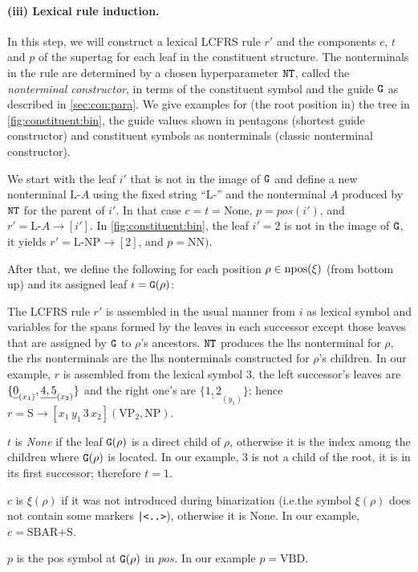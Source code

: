 \documentclass[../document.tex]{subfiles}
\begin{document}
    \paragraph{(iii) Lexical rule induction.}
    In this step, we will construct a lexical LCFRS rule \(r'\) and the components \(c\), \(t\) and \(p\) of the supertag for each leaf in the constituent structure.
    The nonterminals in the rule are determined by a chosen hyperparameter \(\texttt{NT}\), called the \emph{nonterminal constructor}, in terms of the constituent symbol and the guide \(\texttt{G}\) as described in \cref{sec:con:para}.
    We give examples for (the root position in) the tree in \cref{fig:constituent:bin}, the guide values shown in pentagons (shortest guide constructor) and constituent symbols as nonterminals (classic nonterminal constructor).

    We start with the leaf \(i'\) that is not in the image of \(\texttt{G}\) and define a new nonterminal \(\text{L-}A\) using the fixed string ``L-'' and the nonterminal \(A\) produced by \(\texttt{NT}\) for the parent of \(i'\).
    In that case \(c = t = \text{None}\), \(p = \mathit{pos}(i')\), and \(r' = \text{L-}A \to [i']\).
    In \cref{fig:constituent:bin}, the leaf \(i'=2\) is not in the image of \(\texttt{G}\), it yields \(r' = \text{L-NP} \to [2]\), and \(p = \text{NN})\).

    After that, we define the following for each position \(\rho \in \operatorname{npos}(\xi)\) (from bottom up) and its assigned leaf \(i = \texttt{G}(\rho)\):
    \begin{asparaitem}
        \item
        The LCFRS rule \(r'\) is assembled in the usual manner from \(i\) as lexical symbol and variables for the spans formed by the leaves in each successor except those leaves that are assigned by \(\texttt{G}\) to \(\rho\)'s ancestors.
        \(\texttt{NT}\) produces the lhs nonterminal for \(\rho\), the rhs nonterminals are the lhs nonterminals constructed for \(\rho\)'s children.
        In our example, \(r\) is assembled from the lexical symbol \(3\), the left successor's leaves are \(\{\underline{0\vphantom{,}}_{(x_1)}, \underline{4,5} _{(x_2)}\}\) and the right one's are \(\{\underline{1,2} _{(y_1)}\}\);
        hence \(r = \text{S} \to [x_1 \, y_1 \, 3 \, x_2] (\text{VP}_2, \text{NP})\).

        \item
        \(t\) is \emph{None} if the leaf \(\texttt{G}(\rho)\) is a direct child of \(\rho\), otherwise it is the index among the children where \(\texttt{G}(\rho)\) is located.
        In our example, 3 is not a child of the root, it is in its first successor; therefore \(t=1\).

        \item
        \(c\) is \(\xi(\rho)\) if it was not introduced during binarization (i.e.\@ the symbol \(\xi(\rho)\) does not contain some markers \texttt{|<..>}), otherwise it is None.
        In our example, \(c = \text{SBAR+S}\).

        \item
        \(p\) is the pos symbol at \(\texttt{G}(\rho)\) in \(\mathit{pos}\).
        In our example \(p = \text{VBD}\).
    \end{asparaitem}
\end{document}

